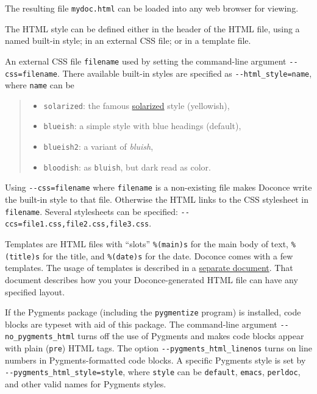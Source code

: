 \documentclass[a4paper]{article}
\begin{document}
The resulting file \texttt{mydoc.html} can be loaded into any web browser for viewing.

The HTML style can be defined either in the header of the HTML file,
using a named built-in style;
in an external CSS file; or in a template file.

An external CSS file \texttt{filename} used by setting the command-line
argument \texttt{-{}-css=filename}. There available built-in styles are
specified as \texttt{-{}-html\_style=name}, where \texttt{name} can be
%
\begin{quote}
%
\begin{itemize}

\item \texttt{solarized}: the famous \href{http://ethanschoonover.com/solarized}{solarized}
style (yellowish),

\item \texttt{blueish}: a simple style with blue headings (default),

\item \texttt{blueish2}: a variant of \emph{bluish},

\item \texttt{bloodish}: as \texttt{bluish}, but dark read as color.

\end{itemize}

\end{quote}

Using \texttt{-{}-css=filename} where \texttt{filename} is a non-existing file makes
Doconce write the built-in style to that file. Otherwise the HTML
links to the CSS stylesheet in \texttt{filename}. Several stylesheets can
be specified: \texttt{-{}-ccs=file1.css,file2.css,file3.css}.

Templates are HTML files with ``slots'' \texttt{\%(main)s} for the main body
of text, \texttt{\%(title)s} for the title, and \texttt{\%(date)s} for the date.
Doconce comes with a few templates. The usage of templates is
described in a \href{https://doconce.googlecode.com/hg/doc/design/wrapper_tech.html}{separate document}. That document describes how you your Doconce-generated
HTML file can have any specified layout.

If the Pygments package (including the \texttt{pygmentize} program)
is installed, code blocks are typeset with
aid of this package. The command-line argument \texttt{-{}-no\_pygments\_html}
turns off the use of Pygments and makes code blocks appear with
plain (\texttt{pre}) HTML tags. The option \texttt{-{}-pygments\_html\_linenos} turns
on line numbers in Pygments-formatted code blocks. A specific
Pygments style is set by \texttt{-{}-pygments\_html\_style=style}, where \texttt{style}
can be \texttt{default}, \texttt{emacs}, \texttt{perldoc}, and other valid names for
Pygments styles.
\end{document}
